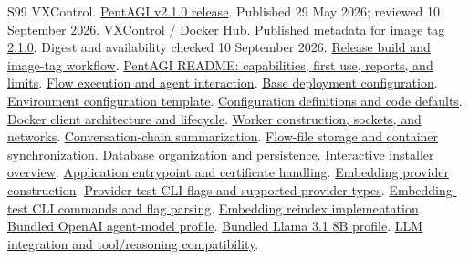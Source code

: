 \documentclass[11pt,letterpaper]{article}
\newcommand{\repourl}{https://github.com/vxcontrol/pentagi/blob/a112db206b2fb7866c367c33348f52f5cdc207d0}
\newcommand{\rfile}[2]{\href{\repourl/#1}{#2}}
\begin{document}
\clearpage
\renewcommand{\refname}{Source register}
{\small
\begin{thebibliography}{S99}
\setlength{\itemsep}{3pt}
 VXControl.
\href{https://github.com/vxcontrol/pentagi/releases/tag/v2.1.0}{PentAGI v2.1.0 release}.
Published 29 May 2026; reviewed 10 September 2026.
 VXControl / Docker Hub.
\href{https://hub.docker.com/v2/repositories/vxcontrol/pentagi/tags/2.1.0}{Published metadata for image tag 2.1.0}.
Digest and availability checked 10 September 2026.
 \rfile{.github/workflows/ci.yml}{Release build and image-tag workflow}.
 \rfile{README.md}{PentAGI README: capabilities, first use, reports, and limits}.
 \rfile{backend/docs/flow_execution.md}{Flow execution and agent interaction}.
 \rfile{docker-compose.yml}{Base deployment configuration}.
 \rfile{.env.example}{Environment configuration template}.
 \rfile{backend/pkg/config/config.go}{Configuration definitions and code defaults}.
 \rfile{backend/docs/docker.md}{Docker client architecture and lifecycle}.
 \rfile{backend/pkg/docker/client.go}{Worker construction, sockets, and networks}.
 \rfile{backend/docs/chain_summary.md}{Conversation-chain summarization}.
 \rfile{backend/pkg/flowfiles/files.go}{Flow-file storage and container synchronization}.
 \rfile{backend/docs/database.md}{Database organization and persistence}.
 \rfile{backend/docs/installer/installer-overview.md}{Interactive installer overview}.
 \rfile{scripts/entrypoint.sh}{Application entrypoint and certificate handling}.
 \rfile{backend/pkg/providers/embeddings/embedder.go}{Embedding provider construction}.
 \rfile{backend/cmd/ctester/main.go}{Provider-test CLI flags and supported provider types}.
 \rfile{backend/cmd/etester/main.go}{Embedding-test CLI commands and flag parsing}.
 \rfile{backend/cmd/etester/reindex.go}{Embedding reindex implementation}.
 \rfile{backend/pkg/providers/openai/config.yml}{Bundled OpenAI agent-model profile}.
 \rfile{examples/configs/ollama-llama318b.provider.yml}{Bundled Llama 3.1 8B profile}.
 \rfile{backend/docs/llms_how_to.md}{LLM integration and tool/reasoning compatibility}.

\end{thebibliography}}
\end{document}
